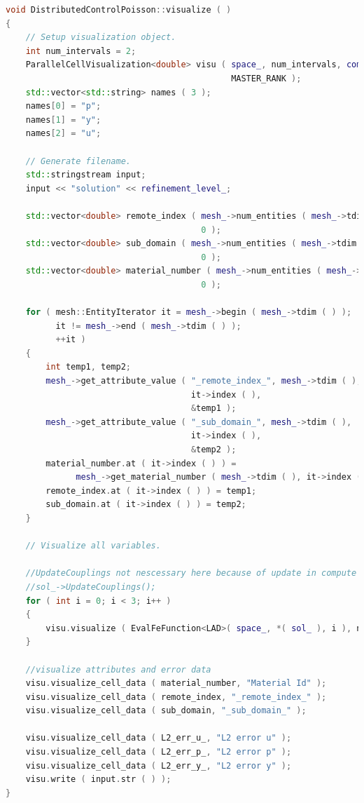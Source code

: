 \documentclass[a4paper, 11pt, twoside]{article}
\begin{document}
\begin{lstlisting}[language=C++, basicstyle={\footnotesize, \ttfamily}, keywordstyle=\color{blue}, numbers=none, tabsize=4]
void DistributedControlPoisson::visualize ( )
{
    // Setup visualization object.
    int num_intervals = 2;
    ParallelCellVisualization<double> visu ( space_, num_intervals, comm_, 
                                             MASTER_RANK );
    std::vector<std::string> names ( 3 );
    names[0] = "p";
    names[1] = "y";
    names[2] = "u";

    // Generate filename.
    std::stringstream input;
    input << "solution" << refinement_level_;

    std::vector<double> remote_index ( mesh_->num_entities ( mesh_->tdim ( ) ), 
                                       0 );
    std::vector<double> sub_domain ( mesh_->num_entities ( mesh_->tdim ( ) ),
                                       0 );
    std::vector<double> material_number ( mesh_->num_entities ( mesh_->tdim ( ) ),
                                       0 );

    for ( mesh::EntityIterator it = mesh_->begin ( mesh_->tdim ( ) );
          it != mesh_->end ( mesh_->tdim ( ) );
          ++it )
    {
        int temp1, temp2;
        mesh_->get_attribute_value ( "_remote_index_", mesh_->tdim ( ),
                                     it->index ( ),
                                     &temp1 );
        mesh_->get_attribute_value ( "_sub_domain_", mesh_->tdim ( ),
                                     it->index ( ),
                                     &temp2 );
        material_number.at ( it->index ( ) ) = 
              mesh_->get_material_number ( mesh_->tdim ( ), it->index ( ) );
        remote_index.at ( it->index ( ) ) = temp1;
        sub_domain.at ( it->index ( ) ) = temp2;
    }

    // Visualize all variables.

    //UpdateCouplings not nescessary here because of update in compute error
    //sol_->UpdateCouplings();
    for ( int i = 0; i < 3; i++ )
    {
        visu.visualize ( EvalFeFunction<LAD>( space_, *( sol_ ), i ), names[i] );
    }

    //visualize attributes and error data
    visu.visualize_cell_data ( material_number, "Material Id" );
    visu.visualize_cell_data ( remote_index, "_remote_index_" );
    visu.visualize_cell_data ( sub_domain, "_sub_domain_" );

    visu.visualize_cell_data ( L2_err_u_, "L2 error u" );
    visu.visualize_cell_data ( L2_err_p_, "L2 error p" );
    visu.visualize_cell_data ( L2_err_y_, "L2 error y" );
    visu.write ( input.str ( ) );
}
\end{lstlisting}
\end{document}
